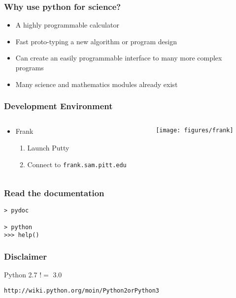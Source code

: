 \documentclass[xcolor=table,10pt,final]{beamer}
\begin{document}
\begin{frame}
  \frametitle{Why use python for science?}
  \begin{itemize}
    \item A highly programmable calculator
    \item Fast proto-typing a new algorithm or program design
    \item Can create an easily programmable interface to many more complex programs
    \item Many science and mathematics modules already exist
  \end{itemize}
\end{frame}

\begin{frame}[fragile]
  \frametitle{Development Environment}
  \begin{columns}
    \begin{column}{0.5\paperwidth}
      \begin{itemize}
        \item Frank
          \begin{enumerate}
            \item Launch Putty
            \item Connect to {\tt frank.sam.pitt.edu}
          \end{enumerate}
      \end{itemize}
    \end{column}
    \begin{column}{0.5\paperwidth}
      \centering
      \texttt{[image: figures/frank]}
    \end{column}
  \end{columns}
\end{frame}

\begin{frame}[fragile]
  \frametitle{Read the documentation}
  \begin{verbatim}
> pydoc

> python
>>> help()
\end{verbatim}
\end{frame}

\begin{frame}[fragile]
  \frametitle{Disclaimer}
  Python 2.7 $!=$ 3.0
  \vskip1cm
  \begin{verbatim}
http://wiki.python.org/moin/Python2orPython3
\end{verbatim}
\end{frame}
\end{document}
